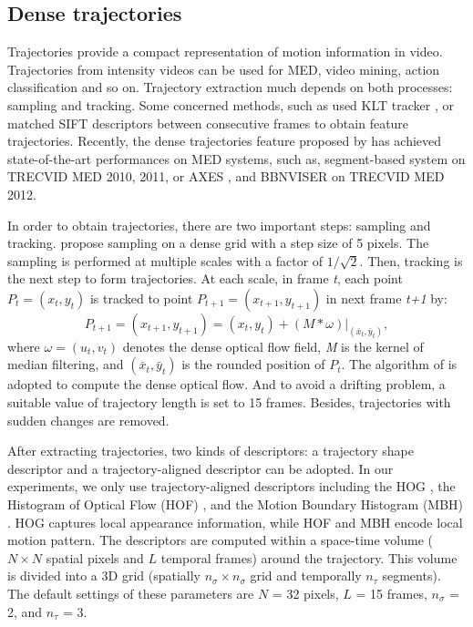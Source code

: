 \documentclass[review]{elsarticle}
\begin{document}

\subsection{Dense trajectories}
Trajectories provide a compact representation of motion information in video. Trajectories from intensity videos can be used for MED, video mining, action classification and so on. Trajectory extraction much depends on both processes: sampling and tracking. Some concerned methods, such as \cite{matikainen2009trajectons, messing2009activity} used KLT tracker \cite{lucas1981iterative}, or \cite{sun2009hierarchical} matched  SIFT descriptors between consecutive frames to obtain feature trajectories. Recently, the dense trajectories feature proposed by \cite{wang2011densetraj} has achieved state-of-the-art performances on MED systems, such as, segment-based system \cite{phan2014multimedia} on TRECVID MED 2010, 2011, or AXES \cite{oneata2012axes}, and BBNVISER \cite{natarajan2012bbn} on TRECVID MED 2012.

In order to obtain trajectories, there are two important steps: sampling and tracking. \cite{wang2011densetraj} propose sampling on a dense grid with a step size of 5 pixels. The sampling is performed at multiple scales with a factor of $1/\sqrt{2}$. Then, tracking is the next step to form trajectories. At each scale, in frame \textit{t}, each point \textit{$P_t = (x_t, y_t)$} is tracked to point \textit{$P_{t+1} = (x_{t+1}, y_{t+1})$} in next frame \textit{t+1} by:
\begin{equation}
	\textit{$P_{t+1} = (x_{t+1}, y_{t+1}) = (x_t, y_t) + (M*\omega)|_{(\bar{x}_t,\bar{y}_t)} $},
\end{equation}
where \textit{$\omega = (u_t, v_t)$} denotes the dense optical flow field, \textit{M} is the kernel of median filtering, and \textit{$(\bar{x}_t,\bar{y}_t)$} is the rounded position of \textit{$P_t$}. The algorithm of \cite{farneback2003two} is adopted to compute the dense optical flow. And to avoid a drifting problem, a suitable value of trajectory length is set to 15 frames. Besides, trajectories with sudden changes are removed.

After extracting trajectories, two kinds of descriptors: a trajectory shape descriptor and a trajectory-aligned descriptor can be adopted. In our experiments, we only use trajectory-aligned descriptors including the HOG \cite{dalal2005histograms}, the Histogram of Optical Flow (HOF) \cite{laptev2008learning}, and the Motion Boundary Histogram (MBH) \cite{dalal2006human}. HOG captures local appearance information, while HOF and MBH encode local motion pattern. The descriptors are computed within a space-time volume ($N \times N$ spatial pixels and $L$ temporal frames) around the trajectory. This volume is divided into a 3D grid (spatially $n_\sigma \times n_\sigma$ grid and temporally $n_\tau$ segments). The default settings of these parameters are $N$ = 32 pixels, $L$ = 15 frames, $n_\sigma$ = 2, and $n_\tau$ = 3.
\end{document}
